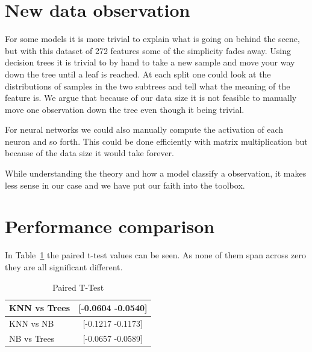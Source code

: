 \section{New data observation}
For some models it is more trivial to explain what is going on behind the scene, but with this dataset of 272 features some of the simplicity fades away. Using decision trees it is trivial to by hand to take a new sample and move your way down the tree until a leaf is reached. At each split one could look at the distributions of samples in the two subtrees and tell what the meaning of the feature is. We argue that because of our data size it is not feasible to manually move one observation down the tree even though it being trivial. 

For neural networks we could also manually compute the activation of each neuron and so forth. This could be done efficiently with matrix multiplication but because of the data size it would take forever. 

While understanding the theory and how a model classify a observation, it makes less sense in our case and we have put our faith into the toolbox. 

\section{Performance comparison}
In Table~\ref{tab:ttest} the paired t-test values can be seen. As none of them span across zero they are all significant different.
\begin{table}[h]
\centering
\begin{tabular}{|l|c|}
\hline
KNN vs Trees & [-0.0604   -0.0540] \\ \hline
KNN vs NB	 & [-0.1217   -0.1173]\\ \hline   %
NB vs Trees  & [-0.0657   -0.0589] \\ \hline					%
\end{tabular}\\
\caption{Paired T-Test\label{tab:ttest}}
\end{table}